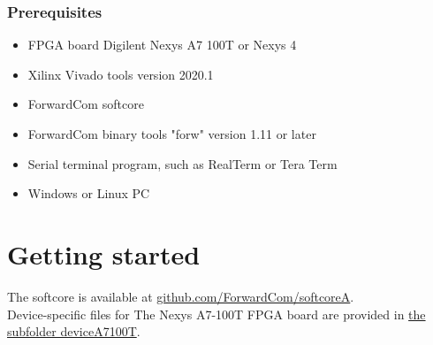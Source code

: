 \documentclass[11pt,a4paper,oneside,openright]{report}
\newcommand{\vv}{ \vspace{2mm} }   %
\begin{document}
\subsection{Prerequisites}
\begin{itemize}
\item FPGA board Digilent Nexys A7 100T or Nexys 4
\item Xilinx Vivado tools version 2020.1
\item ForwardCom softcore
\item ForwardCom binary tools "forw" version 1.11 or later
\item Serial terminal program, such as RealTerm or Tera Term
\item Windows or Linux PC
\end{itemize}
\vv


\chapter{Getting started} \label{Chap:GettingStarted}
The softcore is available at 
\href{https://github.com/ForwardCom/softcoreA}{github.com/ForwardCom/softcoreA}. \\

Device-specific files for The Nexys A7-100T FPGA board are provided in 
\href{https://github.com/ForwardCom/softcoreA/tree/main/deviceA7100T}{the subfolder deviceA7100T}. \\
\end{document}
